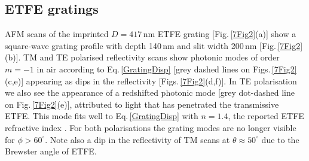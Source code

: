 \subsection{ETFE gratings}
AFM scans of the imprinted $D=417$\,nm ETFE grating [Fig.\,\ref{7Fig2}(a)] show a square-wave grating profile with depth 140\,nm and slit width 200\,nm [Fig.\,\ref{7Fig2}(b)]. TM and TE polarised reflectivity scans show photonic modes of order $m=-1$ in air according to Eq.\,\ref{GratingDisp} [grey dashed lines on Figs.\,\ref{7Fig2}(c,e)] appearing as dips in the reflectivity [Figs.\,\ref{7Fig2}(d,f)]. In TE polarisation we also see the appearance of a redshifted photonic mode [grey dot-dashed line on Fig.\,\ref{7Fig2}(e)], attributed to light that has penetrated the transmissive ETFE. This mode fits well to Eq.\,\ref{GratingDisp} with $n=1.4$, the reported ETFE refractive index \cite{French2011}. For both polarisations the grating modes are no longer visible for $\phi>60^{\circ}$. Note also a dip in the reflectivity of TM scans at $\theta\approx50^{\circ}$ due to the Brewster angle of ETFE.

